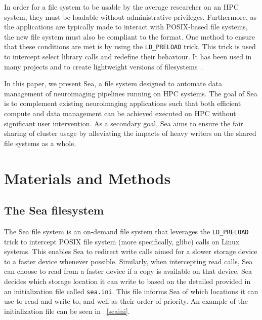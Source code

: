 \documentclass[10pt,journal,compsoc]{IEEEtran}
\begin{document}
In order for a file system to be usable by the average researcher on an HPC system, they must be loadable without administrative
privileges. Furthermore, as the applications are typically made to interact with POSIX-based file systems, the new file system must
also be compliant to the format. One method to ensure that these conditions are met is by using the \texttt{LD\_PRELOAD} trick. This trick is
used to intercept select library calls and redefine their behaviour. It has been used in many projects and to create lightweight versions
of filesystems~\cite{xtreemfs}. 

In this paper, we present Sea, a file system designed to automate data management of neuroimaging pipelines running on HPC systems.
The goal of Sea is to complement existing neuroimaging applications such that both efficient compute and data management can be achieved
executed on HPC without significant user intervention. As a secondary goal, Sea aims to ensure the fair sharing of cluster usage
by alleviating the impacts of heavy writers on the shared file systems as a whole. 






\section{Materials and Methods}

\subsection{The Sea filesystem}

The Sea file system is an on-demand file system that leverages the \texttt{LD\_PRELOAD} trick to intercept POSIX file system (more specifically, glibc)
calls on Linux systems. This enables Sea to redirect write calls aimed for a slower storage device to a faster device whenever
possible. Similarly, when intercepting read calls, Sea can choose to read from a faster device if a copy is available on that device.
Sea decides which storage location it can write to based on the detailed provided in an initialization file called \texttt{sea.ini}. 
This file informs Sea of which locations it can use to read and write to, and well as their order of priority. An example of the initialization
file can be seen in ~\ref{seaini}.
\end{document}
